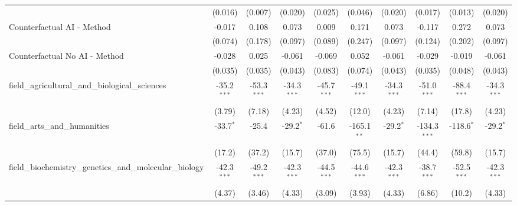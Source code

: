\begin{tabular}{lccccccccc}
                                                               & (0.016)       & (0.007)        & (0.020)       & (0.025)        & (0.046)        & (0.020)       & (0.017)        & (0.013)        & (0.020)\\   
   Counterfactual AI - Method                                  & -0.017        & 0.108          & 0.073         & 0.009          & 0.171          & 0.073         & -0.117         & 0.272          & 0.073\\   
                                                               & (0.074)       & (0.178)        & (0.097)       & (0.089)        & (0.247)        & (0.097)       & (0.124)        & (0.202)        & (0.097)\\   
   Counterfactual No AI - Method                               & -0.028        & 0.025          & -0.061        & -0.069         & 0.052          & -0.061        & -0.029         & -0.019         & -0.061\\   
                                                               & (0.035)       & (0.035)        & (0.043)       & (0.083)        & (0.074)        & (0.043)       & (0.035)        & (0.048)        & (0.043)\\   
   field\_agricultural\_and\_biological\_sciences              & -35.2$^{***}$ & -53.3$^{***}$  & -34.3$^{***}$ & -45.7$^{***}$  & -49.1$^{***}$  & -34.3$^{***}$ & -51.0$^{***}$  & -88.4$^{***}$  & -34.3$^{***}$\\   
                                                               & (3.79)        & (7.18)         & (4.23)        & (4.52)         & (12.0)         & (4.23)        & (7.14)         & (17.8)         & (4.23)\\   
   field\_arts\_and\_humanities                                & -33.7$^{*}$   & -25.4          & -29.2$^{*}$   & -61.6          & -165.1$^{**}$  & -29.2$^{*}$   & -134.3$^{***}$ & -118.6$^{*}$   & -29.2$^{*}$\\   
                                                               & (17.2)        & (37.2)         & (15.7)        & (37.0)         & (75.5)         & (15.7)        & (44.4)         & (59.8)         & (15.7)\\   
   field\_biochemistry\_genetics\_and\_molecular\_biology      & -42.3$^{***}$ & -49.2$^{***}$  & -42.3$^{***}$ & -44.5$^{***}$  & -44.6$^{***}$  & -42.3$^{***}$ & -38.7$^{***}$  & -52.5$^{***}$  & -42.3$^{***}$\\   
                                                               & (4.37)        & (3.46)         & (4.33)        & (3.09)         & (3.93)         & (4.33)        & (6.86)         & (10.2)         & (4.33)\\   

\end{tabular}
